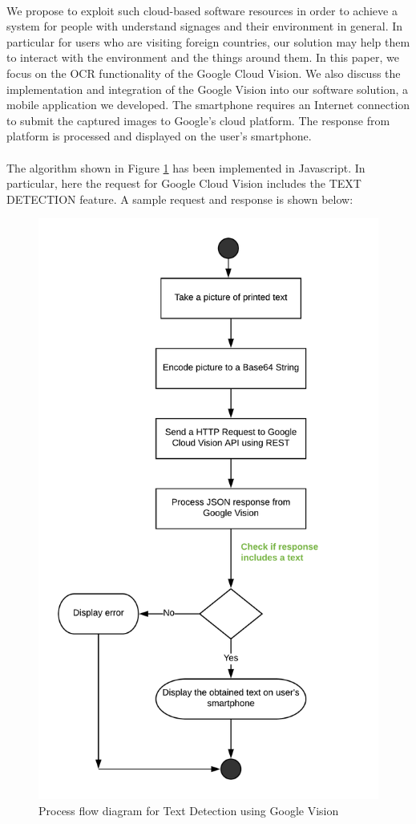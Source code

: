 \documentclass[12pt]{article}
\begin{document}
\paragraph{}We propose to exploit such cloud-based software resources in order to achieve a system for people with understand signages and their environment in general. In particular for users who are visiting foreign countries, our solution may help them to interact with the environment and the things around them. In this paper, we focus on the OCR functionality of the Google Cloud Vision. We also discuss the implementation and integration of the Google Vision into our software solution, a mobile application we developed. The smartphone requires an Internet connection to submit the captured images to Google’s cloud platform. The response from platform is processed and displayed on the user's smartphone.

\paragraph{}The algorithm shown in Figure \ref{fig:vision} has been implemented in Javascript. In particular, here the request for Google Cloud Vision includes the TEXT DETECTION feature. A sample request and response is shown below:

\begin{figure}[H]
	\centering
	\includegraphics[width=0.75\linewidth]{media/VISION_API.png}
	\caption{Process flow diagram for Text Detection using Google Vision}
	\label{fig:vision}
\end{figure} 
\end{document}
